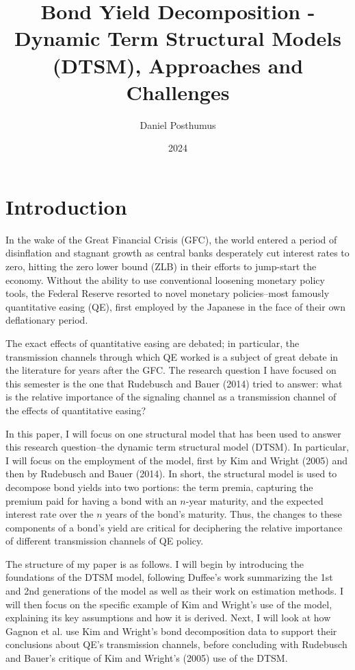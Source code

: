 \documentclass[12pt,final]{article}
\title{Bond Yield Decomposition - Dynamic Term Structural Models (DTSM), Approaches and Challenges}
\author{Daniel Posthumus}
\date{2024}
\begin{document}
\vspace{-2in}
\maketitle
\vspace{-0.75in}
\section{Introduction}

In the wake of the Great Financial Crisis (GFC), the world entered a period of disinflation and stagnant growth as central banks desperately cut interest rates to zero, hitting the zero lower bound (ZLB) in their efforts to jump-start the economy. Without the ability to use conventional loosening monetary policy tools, the Federal Reserve resorted to novel monetary policies--most famously quantitative easing (QE), first employed by the Japanese in the face of their own deflationary period. 

The exact effects of quantitative easing are debated; in particular, the transmission channels through which QE worked is a subject of great debate in the literature for years after the GFC. The research question I have focused on this semester is the one that Rudebusch and Bauer (2014) tried to answer: what is the relative importance of the signaling channel as a transmission channel of the effects of quantitative easing? \citep{Bauer2014}

In this paper, I will focus on one structural model that has been used to answer this research question--the dynamic term structural model (DTSM). In particular, I will focus on the employment of the model, first by Kim and Wright (2005) and then by Rudebusch and Bauer (2014). \citep{Kim2005} \citep{Bauer2014} In short, the structural model is used to decompose bond yields into two portions: the term premia, capturing the premium paid for having a bond with an $n$-year maturity, and the expected interest rate over the $n$ years of the bond's maturity. Thus, the changes to these components of a bond's yield are critical for deciphering the relative importance of different transmission channels of QE policy. 

The structure of my paper is as follows. I will begin by introducing the foundations of the DTSM model, following Duffee's work summarizing the 1st and 2nd generations of the model as well as their work on estimation methods. \citep{Duffee2002} I will then focus on the specific example of Kim and Wright's use of the model, explaining its key assumptions and how it is derived. Next, I will look at how Gagnon et al. use Kim and Wright's bond decomposition data to support their conclusions about QE's transmission channels, before concluding with Rudebusch and Bauer's critique of Kim and Wright's (2005) use of the DTSM.
\end{document}
